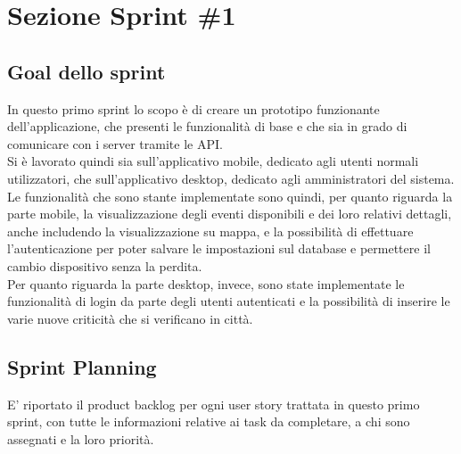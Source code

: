 \documentclass{article}
\begin{document}
\clearpage

\section{Sezione Sprint \#1}

\subsection{Goal dello sprint}
In questo primo sprint lo scopo è di creare un prototipo funzionante dell'applicazione, che presenti le funzionalità di base e che sia in grado di comunicare con i server tramite le API.\\
Si è lavorato quindi sia sull'applicativo mobile, dedicato agli utenti normali utilizzatori, che sull'applicativo desktop, dedicato agli amministratori del sistema.\\
Le funzionalità che sono stante implementate sono quindi, per quanto riguarda la parte mobile, la visualizzazione degli eventi disponibili e dei loro relativi dettagli, anche includendo la visualizzazione su mappa, e la possibilità di effettuare l'autenticazione per poter salvare le impostazioni sul database e permettere il cambio dispositivo senza la perdita.\\
Per quanto riguarda la parte desktop, invece, sono state implementate le funzionalità di login da parte degli utenti autenticati e la possibilità di inserire le varie nuove criticità che si verificano in città.

\subsection{Sprint Planning}
E' riportato il product backlog per ogni user story trattata in questo primo sprint, con tutte le informazioni relative ai task da completare, a chi sono assegnati e la loro priorità.\\
\end{document}
